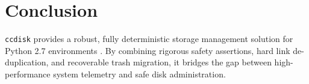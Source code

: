 \documentclass[11pt,article,a4paper]{article}
\begin{document}
\section{Conclusion}
\texttt{ccdisk} provides a robust, fully deterministic storage management solution for Python 2.7 environments \cite{vesely2004python}. By combining rigorous safety assertions, hard link de-duplication, and recoverable trash migration, it bridges the gap between high-performance system telemetry and safe disk administration.



\end{document}
